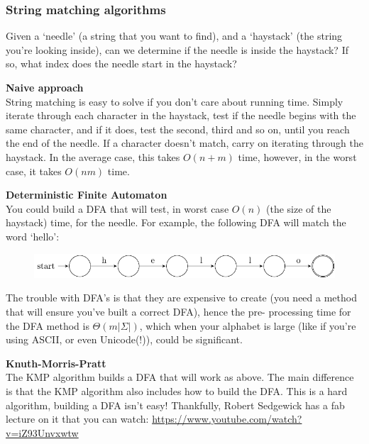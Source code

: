\subsubsection{String matching algorithms}

Given a `needle' (a string that you want to find), and a `haystack' (the string
you're looking inside), can we determine if the needle is inside the haystack?
If so, what index does the needle start in the haystack?

\begin{description}
  \item \textbf{Naive approach}\\
    String matching is easy to solve if you don't care about running time.
    Simply iterate through each character in the haystack, test if the needle
    begins with the same character, and if it does, test the second, third and
    so on, until you reach the end of the needle. If a character doesn't match,
    carry on iterating through the haystack. In the average case, this takes
    $O(n + m)$ time, however, in the worst case, it takes $O(nm)$ time.

  \item \textbf{Deterministic Finite Automaton}\\
    You could build a DFA that will test, in worst case $O(n)$ (the size of the
    haystack) time, for the needle. For example, the following DFA will match
    the word `hello':

    \begin{figure}[H]
      \centering
      \includegraphics[width=\textwidth]{diagrams/hello-automata.pdf}
      \label{hello-automata}
    \end{figure}


    The trouble with DFA's is that they are expensive to create (you need a
    method that will ensure you've built a correct DFA), hence the pre-
    processing time for the DFA method is $\Theta(m |\Sigma|)$, which when your
    alphabet is large (like if you're using ASCII, or even Unicode(!)), could be
    significant.

  \item \textbf{Knuth-Morris-Pratt}\\
    The KMP algorithm builds a DFA that will work as above. The main difference
    is that the KMP algorithm also includes how to build the DFA. This is a hard
    algorithm, building a DFA isn't easy! Thankfully, Robert Sedgewick has a fab
    lecture on it that you can watch:
    \url{https://www.youtube.com/watch?v=iZ93Unvxwtw}

\end{description}

